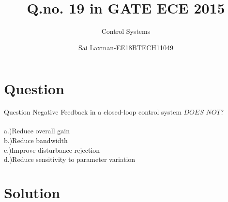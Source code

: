 \documentclass{beamer}
\title[Laxman]{Q.no. 19 in GATE ECE 2015  }
\subtitle{Control Systems}
\author{Sai Laxman-EE18BTECH11049}
\begin{document}
\begin{frame}
\titlepage    
\end{frame}


\section{Question}


\begin{frame}{ Question}
Negative Feedback in a closed-loop control system $DOES$ $ NOT ?$\\
\\
  a.)Reduce overall gain\\
  b.)Reduce bandwidth \\
  c.)Improve disturbance rejection\\
  d.)Reduce sensitivity to parameter variation
\end{frame}





\section{Solution}
\end{document}
